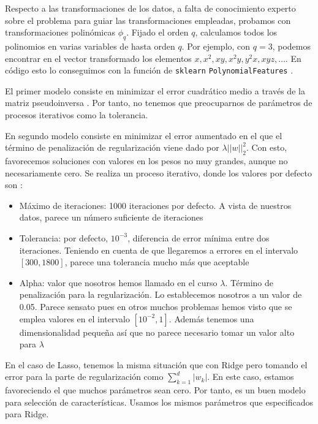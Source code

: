 \documentclass[11pt]{article}
\begin{document}
Respecto a las transformaciones de los datos, a falta de conocimiento experto sobre el problema para guiar las transformaciones empleadas, probamos con transformaciones polinómicas $\phi_q$. Fijado el orden $q$, calculamos todos los polinomios en varias variables de hasta orden $q$. Por ejemplo, con $q=3$, podemos encontrar en el vector transformado los elementos $x, x^2, xy, x^2y, y^2x, xyz, \ldots$. En código esto lo conseguimos con la función de \lstinline{sklearn} \lstinline{PolynomialFeatures} \cite{sklearn_polynomial:online}.

El primer modelo consiste en minimizar el error cuadrático medio a través de la matriz pseudoinversa \cite{sklearn_linear_reg:online}. Por tanto, no tenemos que preocuparnos de parámetros de procesos iterativos como la tolerancia.

En segundo modelo consiste en minimizar el error aumentado en el que el término de penalización de regularización viene dado por $\lambda ||w||^2_2$. Con esto, favorecemos soluciones con valores en los pesos no muy grandes, aunque no necesariamente cero. Se realiza un proceso iterativo, donde los valores por defecto son \cite{sklearn_ridge:online}:

\begin{itemize}
    \item Máximo de iteraciones: 1000 iteraciones por defecto. A vista de nuestros datos, parece un número suficiente de iteraciones
    \item Tolerancia: por defecto, $10^{-3}$, diferencia de error mínima entre dos iteraciones. Teniendo en cuenta de que llegaremos a errores en el intervalo $[300, 1800]$, parece una tolerancia mucho más que aceptable
    \item Alpha: valor que nosotros hemos llamado en el curso $\lambda$. Término de penalización para la regularización. Lo establecemos nosotros a un valor de 0.05. Parece sensato pues en otros muchos problemas hemos visto que se emplea valores en el intervalo $[10^{-2}, 1]$. Además tenemos una dimensionalidad pequeña así que no parece necesario tomar un valor alto para $\lambda$
\end{itemize}

En el caso de Lasso, tenemos la misma situación que con Ridge pero tomando el error para la parte de regularización como $\sum_{k = 1}^{d} |w_k|$. En este caso, estamos favoreciendo el que muchos parámetros sean cero. Por tanto, es un buen modelo para selección de características. Usamos los mismos parámetros que especificados para Ridge.
\end{document}
